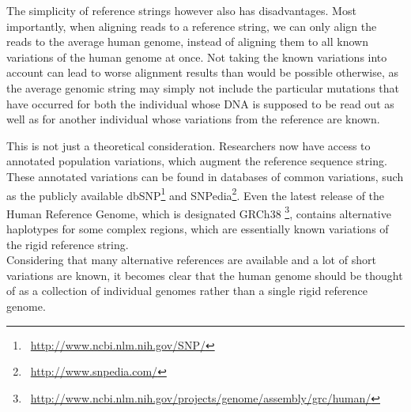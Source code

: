 \documentclass[a4paper,12pt,twoside,BCOR=10mm]{scrbook}
\begin{document}
The simplicity of reference strings however also has disadvantages. 
Most importantly, when aligning reads to a reference string, we can only align 
the reads to the average human genome, instead of aligning them to all known 
variations of the human genome at once. 
Not taking the known variations into account can lead to worse alignment results 
than would be possible otherwise, as the average genomic string may simply not 
include the particular mutations that have occurred for both the individual 
whose DNA is supposed to be read out as well as for another individual whose 
variations from the reference are known.

This is not just a theoretical consideration. 
Researchers now have access to annotated population variations, which augment the reference sequence string. 
These annotated variations can be found in databases of common variations, such as the publicly available  
dbSNP\footnote{\,\,\,\url{http://www.ncbi.nlm.nih.gov/SNP/}} 
and SNPedia\footnote{\,\,\,\url{http://www.snpedia.com/}}. 
Even the latest release of the Human Reference Genome, 
which is designated GRCh38
\footnote{\,\,\,\url{http://www.ncbi.nlm.nih.gov/projects/genome/assembly/grc/human/}}, 
contains alternative haplotypes for some complex regions, 
which are essentially known variations of the rigid reference string. \\
Considering that many alternative references are available and a lot of short variations are known, 
it becomes clear that the human genome should be thought of as a collection of individual genomes 
rather than a single rigid reference genome.
\end{document}
